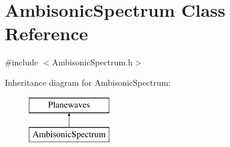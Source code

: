 \hypertarget{class_ambisonic_spectrum}{\section{Ambisonic\-Spectrum Class Reference}
\label{class_ambisonic_spectrum}
}


{\ttfamily \#include $<$Ambisonic\-Spectrum.\-h$>$}

Inheritance diagram for Ambisonic\-Spectrum\-:\begin{figure}[H]
\begin{center}
\leavevmode
\includegraphics[height=2.000000cm]{class_ambisonic_spectrum}
\end{center}
\end{figure}
